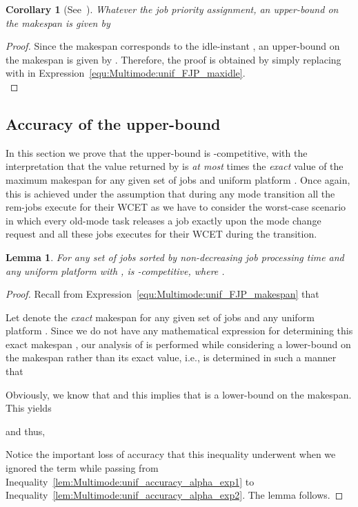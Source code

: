 \documentclass{article}
\newtheorem{validity test}{Validity Test}
\newtheorem{Lemma}{Lemma}
\newtheorem{proof}{Proof}
\newtheorem{Corollary}{Corollary}
\begin{document}
\begin{Corollary}[See~\cite{MeumeuNelisGoossens:10}]
\label{cor:Multimode:unif_FJP_makespan}
Whatever the job priority assignment, an upper-bound  on the makespan is given by

\end{Corollary} 
\begin{proof}
Since the makespan corresponds to the idle-instant , an upper-bound on the makespan is given by . Therefore, the proof is obtained by simply replacing  with  in Expression~\ref{equ:Multimode:unif_FJP_maxidle}. \\
\end{proof}

\subsection{Accuracy of the upper-bound }

In this section we prove that the upper-bound  is -competitive, with the interpretation that the value returned by  is {\em at most}  times the {\em exact} value of the maximum makespan for any given set  of jobs and uniform platform . Once again, this is achieved under the assumption that during any mode transition all the rem-jobs execute for their WCET as we have to consider the worst-case scenario in which every old-mode task releases a job exactly upon the mode change request and all these jobs executes for their WCET during the transition.

\begin{Lemma}
\label{lem:Multimode:unif_accuracy_alpha}
For any set  of jobs sorted by non-decreasing job processing time and any uniform platform  with  ,  is -competitive, where .
\end{Lemma} 
\begin{proof}
Recall from Expression~\ref{equ:Multimode:unif_FJP_makespan} that

Let  denote the \emph{exact} makespan for any given set  of jobs and any uniform platform . Since we do not have any mathematical expression for determining this exact makespan , our analysis of  is performed while considering a lower-bound  on the makespan rather than its exact value, i.e.,  is determined in such a manner that 

Obviously, we know that  and this implies that  is a lower-bound on the makespan. This yields

and thus,

\begin{small}

\end{small}
Notice the important loss of accuracy that this inequality underwent when we ignored the term  while passing from Inequality~\ref{lem:Multimode:unif_accuracy_alpha_exp1} to Inequality~\ref{lem:Multimode:unif_accuracy_alpha_exp2}. The lemma follows.
\end{proof}
\end{document}
